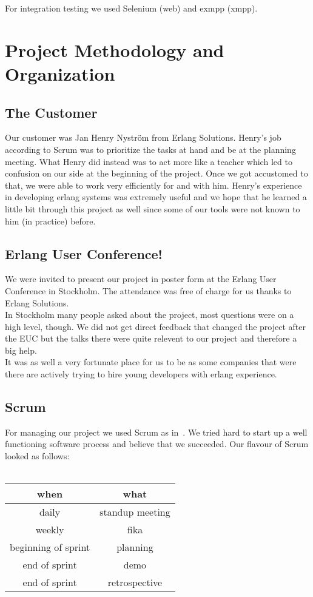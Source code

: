 \documentclass[11pt,a4paper]{report}
\begin{document}
For integration testing we used Selenium (web) and exmpp (xmpp).

\chapter{Project Methodology and Organization}

\section{The Customer}
Our customer was Jan Henry Nyström from Erlang Solutions. Henry's job according to
Scrum was to prioritize the tasks at hand and be at the planning meeting.
What Henry did instead was to act more like a teacher which led to confusion on
our side at the beginning of the project. Once we got accustomed to that,
we were able to work very efficiently for and with him.
Henry's experience in developing erlang systems was extremely useful and we hope
that he learned a little bit through this project as well since some of our
tools were not known to him (in practice) before.
\section{Erlang User Conference!}
We were invited to present our project in poster form at the
Erlang User Conference in Stockholm. The attendance was free of charge for us
thanks to Erlang Solutions. \\
In Stockholm many people asked about the project, most questions were on a high
level, though. We did not get direct feedback that changed the project after the
EUC but the talks there were quite relevent to our project and therefore a big
help. \\
It was as well a very fortunate place for us to be as some companies that were
there are actively trying to hire young developers with erlang experience.
\section{Scrum}
For managing our project we used Scrum as in~\cite{kniberg}.
We tried hard to start up a well functioning software process and believe that
we succeeded. Our flavour of Scrum looked as follows: \\ \\
\begin{tabular}{cc}
  when & what \\ \hline
  daily & standup meeting\\
  weekly & fika \\
  beginning of sprint & planning \\
  end of sprint & demo \\
  end of sprint & retrospective \\
\end{tabular}
\end{document}
